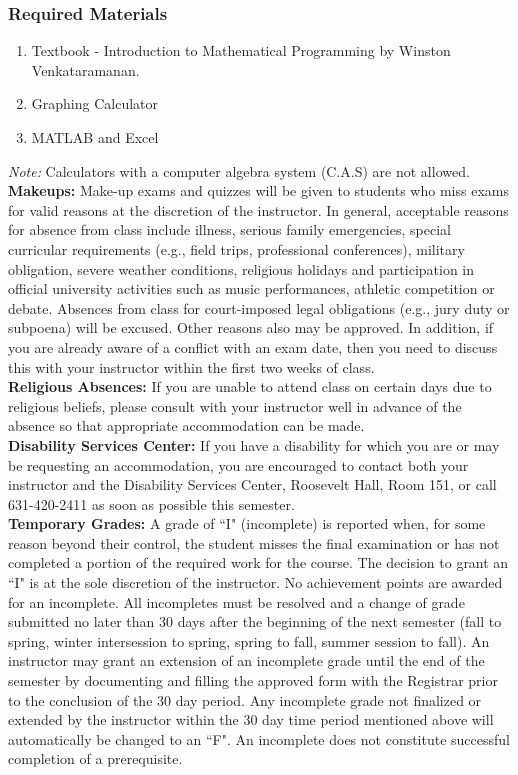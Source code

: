 \documentclass[11pt]{article}
\begin{document}
\subsubsection*{Required Materials}
\begin{enumerate}[--]
 \item Textbook - Introduction to Mathematical Programming by Winston Venkataramanan.
 \item Graphing Calculator
\item MATLAB and Excel
\end{enumerate}
\emph{Note:} Calculators with a computer algebra system (C.A.S) are not allowed. \\

{\bf Makeups:} Make-up exams and quizzes will be given to students who miss exams for valid reasons at the discretion of the instructor. In general, acceptable reasons for absence from class include illness, serious family emergencies, special curricular requirements (e.g., field trips, professional conferences), military obligation, severe weather conditions, religious holidays and participation in official university activities such as music performances, athletic competition or debate. Absences from class for court-imposed legal obligations (e.g., jury duty or subpoena) will be excused. Other reasons also may be approved. In addition, if you are already aware of a conflict with an exam date, then you need to discuss this with your instructor within the first two weeks of class. \\

{\bf Religious Absences:} If you are unable to attend class on certain days due to religious beliefs, please consult with your instructor well in advance of the absence so that appropriate accommodation can be made.\\

{\bf Disability Services Center:} If you have a disability for which you are or may be requesting an accommodation, you are encouraged to contact both your instructor and the Disability Services Center, Roosevelt Hall, Room 151, or call 631-420-2411 as soon as possible this semester.\\

{\bf Temporary Grades:} A grade of ``I" (incomplete) is reported when, for some reason beyond their control, the student misses the final examination or has not completed a portion of the required work for the course. The decision to grant an ``I" is at the sole discretion of the instructor. No achievement points are awarded for an incomplete. All incompletes must be resolved and a change of grade submitted no later than 30 days after the beginning of the next semester (fall to spring, winter intersession to spring, spring to fall, summer session to fall). An instructor may grant an extension of an incomplete grade until the end of the semester by documenting and filling the approved form with the Registrar prior to the conclusion of the 30 day period. Any incomplete grade not finalized or extended by the instructor within the 30 day time period mentioned above will automatically be changed to an ``F". An incomplete does not constitute successful completion of a prerequisite.  \\
\end{document}
